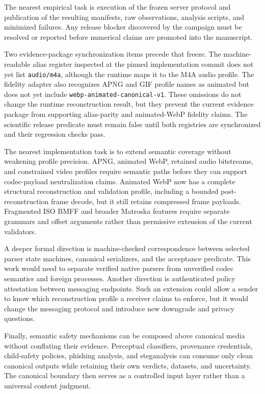 The nearest empirical task is execution of the frozen server protocol and
publication of the resulting manifests, raw observations, analysis scripts,
and minimized failures. Any release blocker discovered by the campaign must be
resolved or reported before numerical claims are promoted into the manuscript.

Two evidence-package synchronization items precede that freeze.  The
machine-readable alias register inspected at the pinned implementation commit
does not yet list \texttt{audio/m4a}, although the runtime maps it to the M4A
audio profile.  The fidelity adapter also recognizes APNG and GIF profile names
as animated but does not yet include
\texttt{webp-animated-canonical-v1}.  These omissions do not change the runtime
reconstruction result, but they prevent the current evidence package from
supporting alias-parity and animated-WebP fidelity claims.  The scientific
release predicate must remain false until both registries are synchronized and
their regression checks pass.

The nearest implementation task is to extend semantic coverage without
weakening profile precision. APNG, animated WebP, retained audio bitstreams,
and constrained video profiles require semantic paths before they can support
codec-payload neutralization claims.  Animated WebP now has a complete
structural reconstruction and validation profile, including a bounded
post-reconstruction frame decode, but it still retains compressed frame
payloads. Fragmented
ISO BMFF and broader Matroska features require separate grammars and offset
arguments rather than permissive extension of the current validators.

A deeper formal direction is machine-checked correspondence between selected
parser state machines, canonical serializers, and the acceptance predicate.
This work would need to separate verified native parsers from unverified codec
semantics and foreign processes. Another direction is authenticated policy
attestation between messaging endpoints. Such an extension could allow a sender
to know which reconstruction profile a receiver claims to enforce, but it would
change the messaging protocol and introduce new downgrade and privacy questions.

Finally, semantic safety mechanisms can be composed above canonical media
without conflating their evidence. Perceptual classifiers, provenance
credentials, child-safety policies, phishing analysis, and steganalysis can
consume only clean canonical outputs while retaining their own verdicts,
datasets, and uncertainty. The canonical boundary then serves as a controlled
input layer rather than a universal content judgment.
